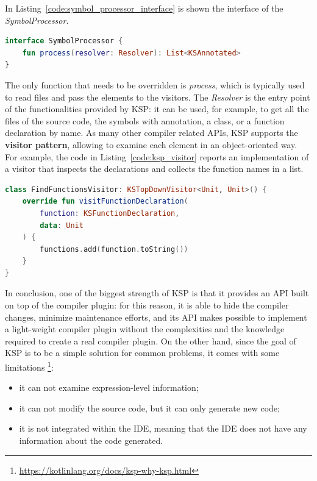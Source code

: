 In Listing~\ref{code:symbol_processor_interface} is shown the interface of the \textit{SymbolProcessor}.
\begin{lstlisting}[caption={SymbolProcessor interface}, language=Kotlin, captionpos=b, label={code:symbol_processor_interface}]
interface SymbolProcessor {
    fun process(resolver: Resolver): List<KSAnnotated>
}
\end{lstlisting}
The only function that needs to be overridden is \textit{process}, which is typically used to read files and pass the elements to the visitors.\newline
The \textit{Resolver} is the entry point of the functionalities provided by KSP: it can be used, for example, to get all the files of the source code, the symbols with annotation, a class, or a function declaration by name.\newline
As many other compiler related APIs, KSP supports the \textbf{visitor pattern}, allowing to examine each element in an object-oriented way.\newline
For example, the code in Listing~\ref{code:ksp_visitor} reports an implementation of a visitor that inspects the declarations and collects the function names in a list.
\begin{lstlisting}[caption={Visitor that collects function declarations}, language=Kotlin, captionpos=b, label={code:ksp_visitor}]
class FindFunctionsVisitor: KSTopDownVisitor<Unit, Unit>() {
    override fun visitFunctionDeclaration(
        function: KSFunctionDeclaration,
        data: Unit
    ) {
        functions.add(function.toString())
    }
}
\end{lstlisting}

In conclusion, one of the biggest strength of KSP is that it provides an API built on top of the compiler plugin: for this reason, it is able to hide the compiler changes, minimize maintenance efforts, and its API makes possible to implement a light-weight compiler plugin without the complexities and the knowledge required to create a real compiler plugin.\newline
On the other hand, since the goal of KSP is to be a simple solution for common problems, it comes with some limitations \footnote{\url{https://kotlinlang.org/docs/ksp-why-ksp.html}}:
\begin{itemize}
    \item it can not examine expression-level information;
    \item it can not modify the source code, but it can only generate new code;
    \item it is not integrated within the IDE, meaning that the IDE does not have any information about the code generated.
\end{itemize}


